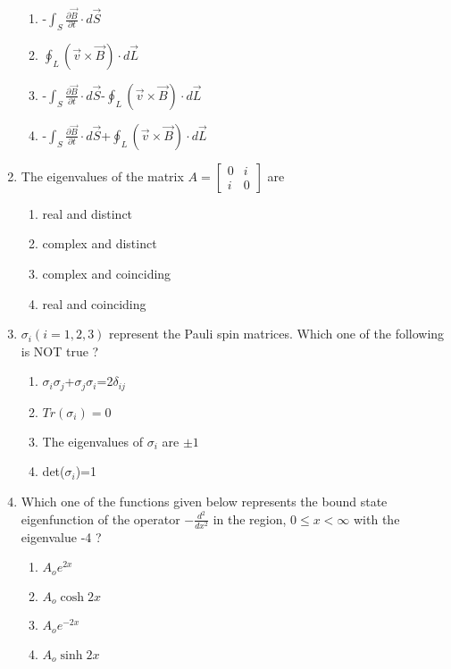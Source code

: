 \documentclass[journal,12pt,onecolumn]{IEEEtran}
\theoremstyle{remark}
\begin{document}
\begin{enumerate}
    \begin{enumerate}
        \item -$\int_S \frac{\partial \overrightarrow{B}}{\partial t} \cdot d\overrightarrow{S}$
        \item $\oint_L (\overrightarrow{v} \times \overrightarrow{B}) \cdot d\overrightarrow{L}$
        \item -$\int_S \frac{\partial \overrightarrow{B}}{\partial t} \cdot d\overrightarrow{S}$-$\oint_L (\overrightarrow{v} \times \overrightarrow{B}) \cdot d\overrightarrow{L}$
        \item -$\int_S \frac{\partial \overrightarrow{B}}{\partial t} \cdot d\overrightarrow{S}$+$\oint_L (\overrightarrow{v} \times \overrightarrow{B}) \cdot d\overrightarrow{L}$
    \end{enumerate}
    \item The eigenvalues of the matrix $A= 
\begin{bmatrix}
0 & i \\
i & 0
\end{bmatrix}
$ are
    \begin{enumerate}
    \item real and distinct
    \item complex and distinct
    \item complex and coinciding
    \item real and coinciding
    \end{enumerate}
    \item $\sigma_i(i=1, 2, 3)$ represent the Pauli spin matrices. Which one of the following is NOT true ?
    \begin{enumerate}
        \item $\sigma_i \sigma_j$+$\sigma_j \sigma_i$=2$\delta_{ij}$
        \item $Tr(\sigma_i)=0$
        \item The eigenvalues of $\sigma_i$ are $\pm1$
        \item det($\sigma_i$)=1
    \end{enumerate}
    \item Which one of the functions given below represents the bound state eigenfunction of the operator $ - \frac{d^2}{dx^2} $ in the region, $0 \leq x < \infty$ with the eigenvalue -4 ? 
    \begin{enumerate}
    \item $A_o e^{2x}$
    \item $A_o \cosh{2x}$
    \item $A_o e^{-2x}$
    \item $A_o \sinh{2x}$

\end{enumerate}
\end{enumerate}
\end{document}
